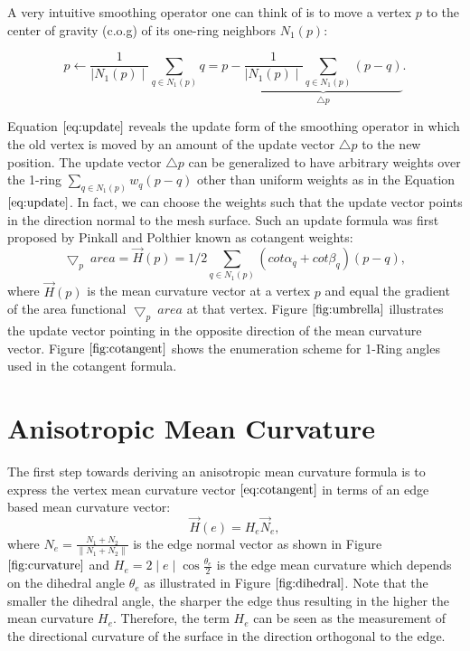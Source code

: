 \documentclass[11pt]{article}
\begin{document}
A very intuitive smoothing operator one can think of is to move a vertex $p$ to the center of gravity (c.o.g) of its one-ring neighbors $N_1(p)$:

\begin{equation}
p \leftarrow \frac{1}{\mid N_1(p) \mid}\sum\limits_{q \in N_1(p)}q = p - \underbrace{\frac{1}{\mid N_1(p) \mid}\sum\limits_{q \in N_1(p)}(p - q)}_{\bigtriangleup p}.
\label{eq:update}
\end{equation}

Equation $\ref{eq:update}$ reveals the update form of the smoothing operator in which the old vertex is moved by an amount of the update vector $\bigtriangleup p$ to the new position. The update vector $\bigtriangleup p$ can be generalized to have arbitrary weights over the 1-ring $\sum\limits_{q \in N_1(p)}w_q(p - q)$ other than uniform weights as in the Equation $\ref{eq:update}$. In fact, we can choose the weights such that the update vector points in the direction normal to the mesh surface. Such an update formula was first proposed by Pinkall and Polthier \cite{Pinkall93computingdiscrete} known as cotangent weights:
\begin{equation}
\bigtriangledown_p\ area = \vec{H}(p) = 1/2\sum\limits_{q \in N_1(p)}{(cot\alpha_{q} + cot\beta_{q})(p-q)},
\label{eq:cotangent}
\end{equation}
where $\vec{H}(p)$ is the mean curvature vector at a vertex $p$ and equal the gradient of the area functional $\bigtriangledown_p\ area$ at that vertex. Figure $\ref{fig:umbrella}$ illustrates the update vector pointing in the opposite direction  of the mean curvature vector. Figure $\ref{fig:cotangent}$ shows the enumeration scheme for 1-Ring angles used in the cotangent formula.

\section{Anisotropic Mean Curvature}

The first step towards deriving an anisotropic mean curvature formula is to express the vertex mean curvature vector $\ref{eq:cotangent}$ in terms of an edge based mean curvature vector:
\begin{equation}
  \vec{H}(e) = H_e \vec{N}_e,
  \label{eq:edgeMC}
\end{equation}
where $N_e = \frac{N_1 + N_2}{\parallel N_1 + N_2 \parallel}$ is the edge normal vector as shown in Figure $\ref{fig:curvature}$ and $H_e = 2\mid e \mid \cos \frac{\theta_e}{2}$ is the edge mean curvature which depends on the dihedral angle $\theta_e$ as illustrated in Figure $\ref{fig:dihedral}$. Note that the smaller the dihedral angle, the sharper the edge thus resulting in the higher the mean curvature $H_e$. Therefore, the term $H_e$ can be seen as the measurement of the directional curvature of the surface in the direction orthogonal to the edge.
\end{document}
